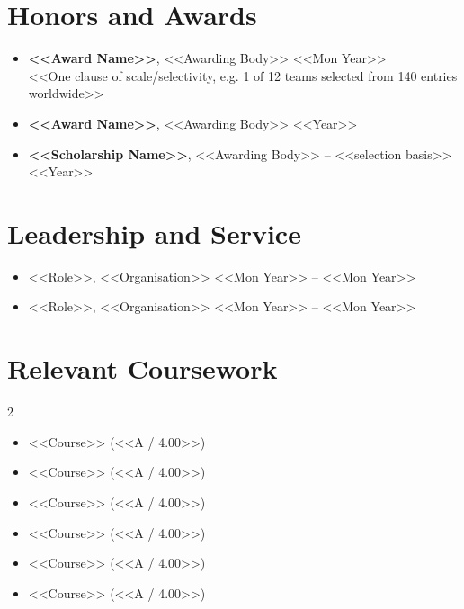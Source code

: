 \documentclass[a4paper,10pt]{article}
\begin{document}
\section{Honors and Awards}
\begin{itemize}
  \item \textbf{<<Award Name>>}, <<Awarding Body>> \hfill <<Mon Year>>\\
        <<One clause of scale/selectivity, e.g. 1 of 12 teams selected from 140 entries worldwide>>
  \item \textbf{<<Award Name>>}, <<Awarding Body>> \hfill <<Year>>
  \item \textbf{<<Scholarship Name>>}, <<Awarding Body>> -- <<selection basis>> \hfill <<Year>>
\end{itemize}

\section{Leadership and Service}
\begin{itemize}
  \item <<Role>>, <<Organisation>> \hfill <<Mon Year>> -- <<Mon Year>>
  \item <<Role>>, <<Organisation>> \hfill <<Mon Year>> -- <<Mon Year>>
\end{itemize}

\section{Relevant Coursework}
\begin{multicols}{2}
\begin{itemize}
  \item <<Course>> (<<A / 4.00>>)
  \item <<Course>> (<<A / 4.00>>)
  \item <<Course>> (<<A / 4.00>>)
  \item <<Course>> (<<A / 4.00>>)
  \item <<Course>> (<<A / 4.00>>)
  \item <<Course>> (<<A / 4.00>>)
\end{itemize}
\end{multicols}
\end{document}
